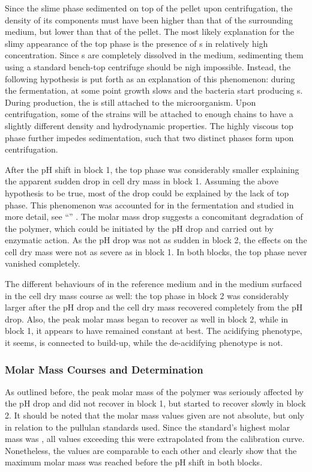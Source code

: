 Since the slime phase sedimented on top of the pellet upon centrifugation, the density of its components must have been higher than that of the surrounding medium, but lower than that of the pellet. The most likely explanation for the slimy appearance of the top phase is the presence of \eps{}s in relatively high concentration. Since \eps{}s are completely dissolved in the medium, sedimenting them using a standard bench-top centrifuge should be nigh impossible. Instead, the following hypothesis is put forth as an explanation of this phenomenon: during the fermentation, at some point growth slows and the bacteria start producing \eps{}s. During production, the \eps{} is still attached to the microorganism. Upon centrifugation, some of the strains will be attached to enough \eps{} chains to have a slightly different density and hydrodynamic properties. The highly viscous top phase further impedes sedimentation, such that two distinct phases form upon centrifugation.

After the pH shift in block 1, the top phase was considerably smaller explaining the apparent sudden drop in cell dry mass in block 1. Assuming the above hypothesis to be true, most of the drop could be explained by the lack of top phase. This phenomenon was accounted for in the  fermentation and studied in more detail, see \enquote{} . The molar mass drop suggests a concomitant degradation of the polymer, which could be initiated by the pH drop and carried out by enzymatic action. As the pH drop was not as sudden in block 2, the effects on the cell dry mass were not as severe as in block 1. In both blocks, the top phase never vanished completely.

The different behaviours of \strain{} in the reference medium and in the \lch{} medium surfaced in the cell dry mass course as well: the top phase in block 2 was considerably larger after the pH drop and the cell dry mass recovered completely from the pH drop. Also, the peak molar mass began to recover as well in block 2, while in block 1, it appears to have remained constant at best. The acidifying phenotype, it seems, is connected to \eps{} build-up, while the de-acidifying phenotype is not.

\subsubsection{Molar Mass Courses and Determination}
As outlined before, the peak molar mass of the polymer was seriously affected by the pH drop and did not recover in block 1, but started to recover slowly in block 2. It should be noted that the molar mass values given are not absolute, but only in relation to the pullulan standards used. Since the standard's highest molar mass was , all values exceeding this were extrapolated from the calibration curve. Nonetheless, the values are comparable to each other and clearly show that the maximum molar mass was reached before the pH shift in both blocks.

